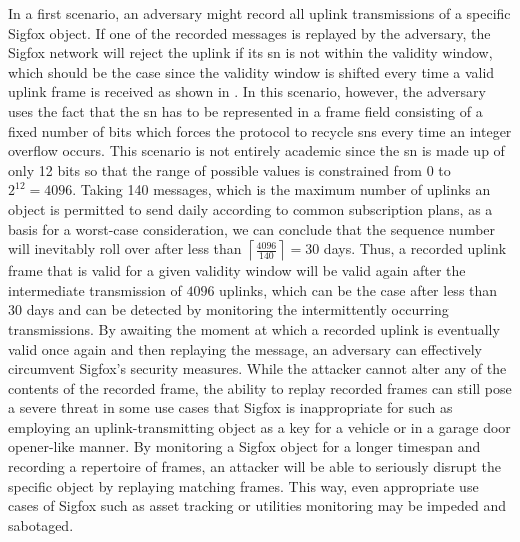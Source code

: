 In a first scenario, an adversary might record all uplink transmissions of a specific Sigfox object.
If one of the recorded messages is replayed by the adversary, the Sigfox network will reject the uplink if its \gls{sn} is not within the validity window, which should be the case since the validity window is shifted every time a valid uplink frame is received as shown in .
In this scenario, however, the adversary uses the fact that the \gls{sn} has to be represented in a frame field consisting of a fixed number of bits which forces the protocol to recycle \glspl{sn} every time an integer overflow occurs.
This scenario is not entirely academic since the \gls{sn} is made up of only 12 bits so that the range of possible values is constrained from 0 to $2^{12} = 4096$.
Taking 140 messages, which is the maximum number of uplinks an object is permitted to send daily according to common subscription plans, as a basis for a worst-case consideration, we can conclude that the sequence number will inevitably roll over after less than $\left \lceil \frac{4096}{140} \right \rceil = 30$ days.
Thus, a recorded uplink frame that is valid for a given validity window will be valid again after the intermediate transmission of $4096$ uplinks, which can be the case after less than $30$ days and can be detected by monitoring the intermittently occurring transmissions.
By awaiting the moment at which a recorded uplink is eventually valid once again and then replaying the message, an adversary can effectively circumvent Sigfox's security measures.
While the attacker cannot alter any of the contents of the recorded frame, the ability to replay recorded frames can still pose a severe threat in some use cases that Sigfox is inappropriate for such as employing an uplink-transmitting object as a key for a vehicle or in a garage door opener-like manner.
By monitoring a Sigfox object for a longer timespan and recording a repertoire of frames, an attacker will be able to seriously disrupt the specific object by replaying matching frames.
This way, even appropriate use cases of Sigfox such as asset tracking or utilities monitoring may be impeded and sabotaged.

